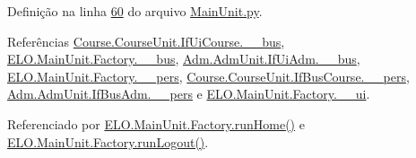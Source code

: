 Definição na linha \hyperlink{MainUnit_8py_source_l00060}{60} do arquivo \hyperlink{MainUnit_8py_source}{Main\-Unit.\-py}.



Referências \hyperlink{CourseUnit_8py_source_l00027}{Course.\-Course\-Unit.\-If\-Ui\-Course.\-\_\-\-\_\-bus}, \hyperlink{MainUnit_8py_source_l00039}{E\-L\-O.\-Main\-Unit.\-Factory.\-\_\-\-\_\-bus}, \hyperlink{AdmUnit_8py_source_l00067}{Adm.\-Adm\-Unit.\-If\-Ui\-Adm.\-\_\-\-\_\-bus}, \hyperlink{MainUnit_8py_source_l00040}{E\-L\-O.\-Main\-Unit.\-Factory.\-\_\-\-\_\-pers}, \hyperlink{CourseUnit_8py_source_l00056}{Course.\-Course\-Unit.\-If\-Bus\-Course.\-\_\-\-\_\-pers}, \hyperlink{AdmUnit_8py_source_l00112}{Adm.\-Adm\-Unit.\-If\-Bus\-Adm.\-\_\-\-\_\-pers} e \hyperlink{MainUnit_8py_source_l00038}{E\-L\-O.\-Main\-Unit.\-Factory.\-\_\-\-\_\-ui}.



Referenciado por \hyperlink{classELO_1_1MainUnit_1_1Factory_a766943202ba781821cf749ca0fb133ba}{E\-L\-O.\-Main\-Unit.\-Factory.\-run\-Home()} e \hyperlink{classELO_1_1MainUnit_1_1Factory_aa26c51486ba65030399897a6e3b4f4f1}{E\-L\-O.\-Main\-Unit.\-Factory.\-run\-Logout()}.


